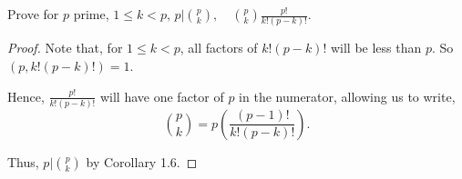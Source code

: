 \documentclass[../hw1]{subfiles}
\begin{document}
\begin{problem}[8]
Prove for $p$ prime,  $1\le k < p,\, p | \binom{p}{k},\quad \binom{p}{k} \frac{p!}{k!(p-k)!}$.
\end{problem}
\begin{proof}
	Note that, for $1\le k < p$, all factors of $k!(p-k)!$ will be less than $p$. So $(p,k!(p-k)!)=1$.

	Hence, $\frac{p!}{k!(p-k)!}$ will have one factor of $p$ in the numerator, allowing us to write, \[
		\binom{p}{k}=p \left( \frac{(p-1)!}{k!(p-k)!} \right)
		.\]

	Thus, $p|\binom{p}{k}$ by Corollary 1.6.
\end{proof}
\end{document}
